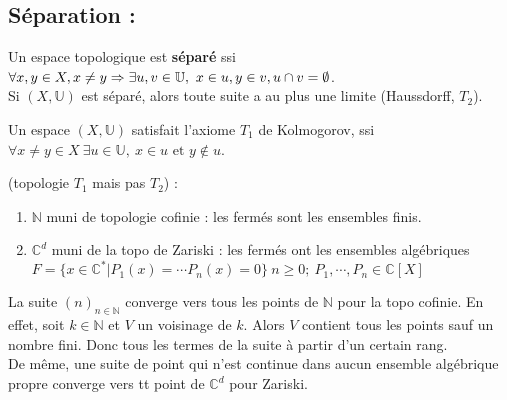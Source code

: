 \subsection{ Séparation :}
\begin{definition}
    Un espace topologique est \textbf{séparé} ssi $\forall x,y\in X,\\ x\neq y\Rightarrow \exists u,v\in \mathbb{U},\ x\in u, y\in v, u\cap v=\emptyset $.\\
Si $(X,\mathbb{U})$ est séparé, alors toute suite a au plus une limite (Haussdorff, $T_2$).\\

\end{definition}
\begin{definition}
        Un espace $(X,\mathbb{U})$ satisfait l'axiome $T_1$ de Kolmogorov, ssi $\forall x\neq y\in X\ \exists u\in \mathbb{U},\ x\in u \text{ et } y \not \in u$.\\

\end{definition}
\begin{ex}
 (topologie $T_1$ mais pas $T_2$) :
\begin{enumerate}

   \item $\mathbb{N} $ muni de topologie cofinie : les fermés sont les ensembles finis.
\item $\mathbb{C}^d$ muni de la topo de Zariski : les fermés ont les ensembles algébriques $F=\{x\in \mathbb{C}^*|P_1(x)=\cdots P_n(x)=0\}\ n\ge 0;\ P_1,\cdots,P_n\in \mathbb{C}[X]$
\end{enumerate}
\end{ex}
\begin{ex}

La suite $(n)_{n\in \mathbb{N} }$ converge vers tous les points de $\mathbb{N} $ pour la topo cofinie. En effet, soit $k\in \mathbb{N} $ et $V$ un voisinage de $k$. Alors $V$ contient tous les points sauf un nombre fini. Donc tous les termes de la suite à partir d'un certain rang.\\
De même, une suite de point qui n'est continue dans aucun ensemble algébrique propre converge vers tt point de $\mathbb{C}^d$ pour Zariski.
\end{ex}

